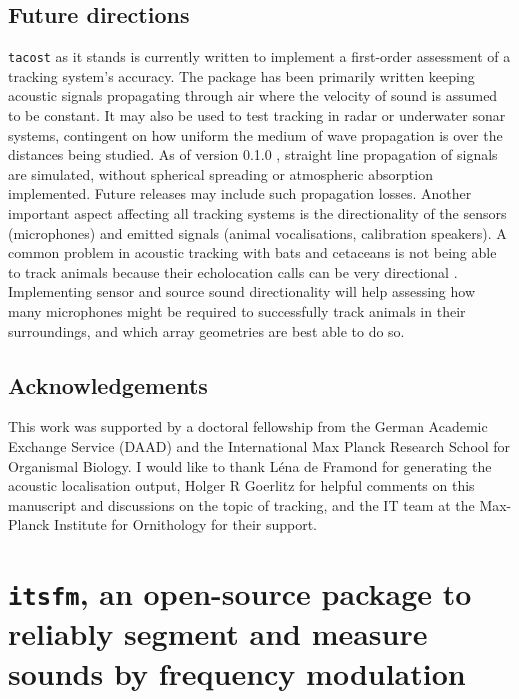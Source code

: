 \documentclass[
]{book}
\begin{document}
\hypertarget{future-directions}{%
\section{Future directions}\label{future-directions}}

\texttt{tacost} as it stands is currently written to implement a first-order assessment of a tracking system's accuracy. The package has been primarily written keeping acoustic signals propagating through air where the velocity of sound is assumed to be constant. It may also be used to test tracking in radar or underwater sonar systems, contingent on how uniform the medium of wave propagation is over the distances being studied. As of version 0.1.0
, straight line propagation of signals are simulated, without spherical spreading or atmospheric absorption implemented. Future releases may include such propagation losses. Another important aspect affecting all tracking systems is the directionality of the sensors (microphones) and emitted signals (animal vocalisations, calibration speakers). A common problem in acoustic tracking with bats and cetaceans is not being able to track animals because their echolocation calls can be very directional \citep{matsuta2013adaptive, Surlykke2012, Koblitz2016}. Implementing sensor and source sound directionality will help assessing how many microphones might be required to successfully track animals in their surroundings, and which array geometries are best able to do so.

\hypertarget{acknowledgements-4}{%
\section{Acknowledgements}\label{acknowledgements-4}}

This work was supported by a doctoral fellowship from the German Academic Exchange Service (DAAD) and the International Max Planck Research School for Organismal Biology.
I would like to thank Léna de Framond for generating the acoustic localisation output, Holger R Goerlitz for helpful comments on this manuscript and discussions on the topic of tracking, and the IT team at the Max-Planck Institute for Ornithology for their support.

\hypertarget{itsfmchapter}{%
\chapter{\texorpdfstring{\texttt{itsfm}, an open-source package to reliably segment and measure sounds by frequency modulation}{itsfm, an open-source package to reliably segment and measure sounds by frequency modulation}}\label{itsfmchapter}}
\end{document}
